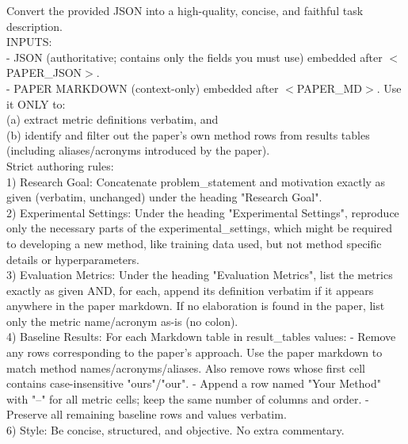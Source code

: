 \documentclass[11pt]{article}
\theoremstyle{plain}
\theoremstyle{definition}
\theoremstyle{remark}
\begin{document}
\begin{tcolorbox}[
    colback=white,
    colframe=myPastelBlue,
    title=\textbf{\textcolor{black}{Create Task Description From Extracted Card}},
    boxrule=0.5mm,
    width=\linewidth,
    arc=2mm,
    boxsep=5pt,
    left=6pt, right=6pt, top=6pt, bottom=6pt,
]

Convert the provided JSON into a high-quality, concise, and faithful task description.\\

INPUTS:\\
- JSON (authoritative; contains only the fields you must use) embedded after $<$PAPER\_JSON$>$.\\
- PAPER MARKDOWN (context-only) embedded after $<$PAPER\_MD$>$. Use it ONLY to:\\
  (a) extract metric definitions verbatim, and\\
  (b) identify and filter out the paper's own method rows from results tables (including aliases/acronyms introduced by the paper).\\

Strict authoring rules:\\
1) Research Goal: Concatenate problem\_statement and motivation exactly as given (verbatim, unchanged) under the heading "Research Goal".\\
2) Experimental Settings: Under the heading "Experimental Settings", reproduce only  the necessary parts of the experimental\_settings, which might be required to developing a new method, like training data used, but not method specific details or hyperparameters.\\
3) Evaluation Metrics: Under the heading "Evaluation Metrics", list the metrics exactly as given AND, for each, append its definition verbatim if it appears anywhere in the paper markdown. If no elaboration is found in the paper, list only the metric name/acronym as-is (no colon).\\
4) Baseline Results: For each Markdown table in result\_tables values:
   - Remove any rows corresponding to the paper's approach. Use the paper markdown to match method names/acronyms/aliases. Also remove rows whose first cell contains case-insensitive "ours"/"our".
   - Append a row named "Your Method" with "--" for all metric cells; keep the same number of columns and order.
   - Preserve all remaining baseline rows and values verbatim.\\
6) Style: Be concise, structured, and objective. No extra commentary.\\


\end{tcolorbox}
\end{document}
